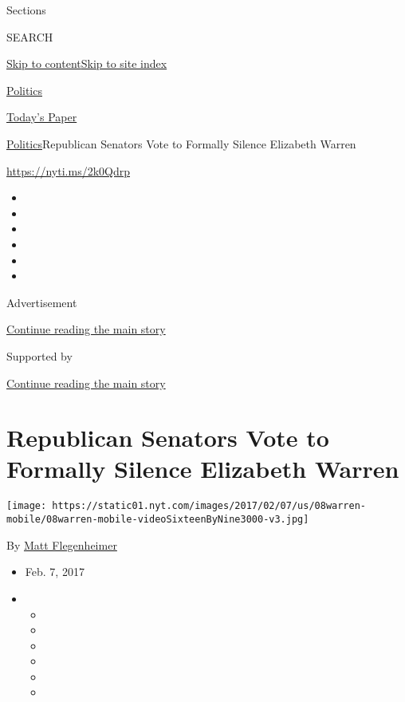 Sections

SEARCH

\protect\hyperlink{site-content}{Skip to
content}\protect\hyperlink{site-index}{Skip to site index}

\href{https://www.nytimes.com/section/politics}{Politics}

\href{https://myaccount.nytimes.com/auth/login?response_type=cookie\&client_id=vi}{}

\href{https://www.nytimes.com/section/todayspaper}{Today's Paper}

\href{/section/politics}{Politics}\textbar{}Republican Senators Vote to
Formally Silence Elizabeth Warren

\url{https://nyti.ms/2k0Qdrp}

\begin{itemize}
\item
\item
\item
\item
\item
\item
\end{itemize}

Advertisement

\protect\hyperlink{after-top}{Continue reading the main story}

Supported by

\protect\hyperlink{after-sponsor}{Continue reading the main story}

\hypertarget{republican-senators-vote-to-formally-silence-elizabeth-warren}{%
\section{Republican Senators Vote to Formally Silence Elizabeth
Warren}\label{republican-senators-vote-to-formally-silence-elizabeth-warren}}

\texttt{[image: https://static01.nyt.com/images/2017/02/07/us/08warren-mobile/08warren-mobile-videoSixteenByNine3000-v3.jpg]}

By \href{http://www.nytimes.com/by/matt-flegenheimer}{Matt Flegenheimer}

\begin{itemize}
\item
  Feb. 7, 2017
\item
  \begin{itemize}
  \item
  \item
  \item
  \item
  \item
  \item
  \end{itemize}
\end{itemize}

